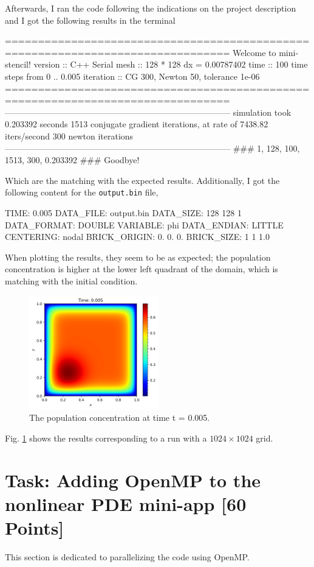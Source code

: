 \documentclass[unicode,11pt,a4paper,oneside,numbers=endperiod,openany]{scrartcl}
\begin{document}
Afterwards, I ran the code following the indications on the project description
and I got the following results in the terminal
\begin{grayverbatim}
================================================================================
                      Welcome to mini-stencil!
version   :: C++ Serial
mesh      :: 128 * 128 dx = 0.00787402
time      :: 100 time steps from 0 .. 0.005
iteration :: CG 300, Newton 50, tolerance 1e-06
================================================================================
--------------------------------------------------------------------------------
simulation took 0.203392 seconds
1513 conjugate gradient iterations, at rate of 7438.82 iters/second
300 newton iterations
--------------------------------------------------------------------------------
### 1, 128, 100, 1513, 300, 0.203392 ###
Goodbye!
\end{grayverbatim}
Which are the matching with the expected results.
Additionally, I got the following content for the \texttt{output.bin} file,
\begin{grayverbatim}
TIME: 0.005
DATA_FILE: output.bin
DATA_SIZE: 128 128 1
DATA_FORMAT: DOUBLE
VARIABLE: phi
DATA_ENDIAN: LITTLE
CENTERING: nodal
BRICK_ORIGIN: 0. 0. 0.
BRICK_SIZE: 1 1  1.0
\end{grayverbatim}
When plotting the results, they seem to be as expected; the population concentration is higher at
the lower left quadrant of the domain, which is matching with the initial condition.
\begin{figure}[!h]
    \centering
    \includegraphics[width=0.5\textwidth]{../mini_app/output_high_res.png}
    \caption{The population concentration at time t = 0.005.}
    \label{im:final_time}
\end{figure}
Fig. \ref{im:final_time} shows the results corresponding to a run with a $1024 \times 1024$ grid.

\section{Task:  Adding OpenMP to the nonlinear PDE mini-app [60 Points]}
This section is dedicated to parallelizing the code using OpenMP. 
\end{document}
